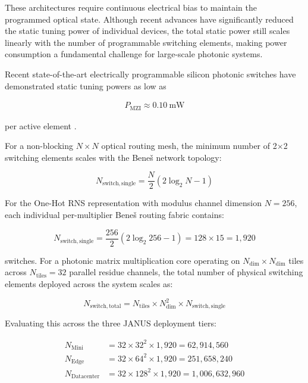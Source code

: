 \documentclass[journal]{IEEEtran}
\begin{document}
These architectures require continuous electrical bias to maintain the programmed optical state. Although recent advances have significantly reduced the static tuning power of individual devices, the total static power still scales linearly with the number of programmable switching elements, making power consumption a fundamental challenge for large-scale photonic systems.

Recent state-of-the-art electrically programmable silicon photonic switches have demonstrated static tuning powers as low as

\begin{align}
P_{\mathrm{MZI}}
\approx
0.10~\mathrm{mW}
\label{eq:mzi_static_power}
\end{align}

per active element \cite{Sinatkas2021}.

For a non-blocking $N \times N$ optical routing mesh, the minimum number of 2$\times$2 switching elements scales with the Bene\v{s} network topology:

\begin{equation}
N_{\mathrm{switch,single}} = \frac{N}{2}(2\log_2 N - 1)
\label{eq:benes_switches}
\end{equation}

For the One-Hot RNS representation with modulus channel dimension $N = 256$, each individual per-multiplier Bene\v{s} routing fabric contains:

\begin{equation}
N_{\mathrm{switch,single}} = \frac{256}{2}(2\log_2 256 - 1) = 128 \times 15 = 1,920
\label{eq:benes_256}
\end{equation}

switches. For a photonic matrix multiplication core operating on $N_{\mathrm{dim}} \times N_{\mathrm{dim}}$ tiles across $N_{\mathrm{tiles}} = 32$ parallel residue channels, the total number of physical switching elements deployed across the system scales as:

\begin{equation}
N_{\mathrm{switch,total}} = N_{\mathrm{tiles}} \times N_{\mathrm{dim}}^2 \times N_{\mathrm{switch,single}}
\label{eq:total_switches}
\end{equation}

Evaluating this across the three JANUS deployment tiers:

\begin{align}
N_{\mathrm{Mini}}      &= 32 \times 32^2 \times 1,920 = 62,914,560 \label{eq:switch_mini} \\
N_{\mathrm{Edge}}      &= 32 \times 64^2 \times 1,920 = 251,658,240 \label{eq:switch_edge} \\
N_{\mathrm{Datacenter}} &= 32 \times 128^2 \times 1,920 = 1,006,632,960 \label{eq:switch_dc}
\end{align}
\end{document}
